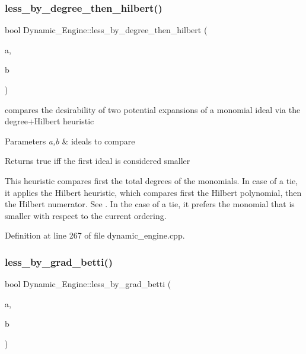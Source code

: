 \subsubsection{\texorpdfstring{less\+\_\+by\+\_\+degree\+\_\+then\+\_\+hilbert()}{less\_by\_degree\_then\_hilbert()}}
{\footnotesize\ttfamily bool Dynamic\+\_\+\+Engine\+::less\+\_\+by\+\_\+degree\+\_\+then\+\_\+hilbert (\begin{DoxyParamCaption}\item[{\hyperlink{group___g_b_computation_class_dynamic___engine_1_1_p_p___with___ideal}{P\+P\+\_\+\+With\+\_\+\+Ideal} \&}]{a,  }\item[{\hyperlink{group___g_b_computation_class_dynamic___engine_1_1_p_p___with___ideal}{P\+P\+\_\+\+With\+\_\+\+Ideal} \&}]{b }\end{DoxyParamCaption})}



compares the desirability of two potential expansions of a monomial ideal via the degree+\+Hilbert heuristic 


\begin{DoxyParams}{Parameters}
{\em a,b} & ideals to compare \\
\hline
\end{DoxyParams}
\begin{DoxyReturn}{Returns}
{\ttfamily true} iff the first ideal is considered smaller
\end{DoxyReturn}
This heuristic compares first the total degrees of the monomials. In case of a tie, it applies the Hilbert heuristic, which compares first the Hilbert polynomial, then the Hilbert numerator. See \cite{CaboaraDynAlg}. In the case of a tie, it prefers the monomial that is smaller with respect to the current ordering. 

Definition at line 267 of file dynamic\+\_\+engine.\+cpp.

\mbox{\label{namespace_dynamic___engine_a8c67515d04de029583ba590b2ca4d6e4}} 
\subsubsection{\texorpdfstring{less\+\_\+by\+\_\+grad\+\_\+betti()}{less\_by\_grad\_betti()}}
{\footnotesize\ttfamily bool Dynamic\+\_\+\+Engine\+::less\+\_\+by\+\_\+grad\+\_\+betti (\begin{DoxyParamCaption}\item[{\hyperlink{group___g_b_computation_class_dynamic___engine_1_1_p_p___with___ideal}{P\+P\+\_\+\+With\+\_\+\+Ideal} \&}]{a,  }\item[{\hyperlink{group___g_b_computation_class_dynamic___engine_1_1_p_p___with___ideal}{P\+P\+\_\+\+With\+\_\+\+Ideal} \&}]{b }\end{DoxyParamCaption})}



